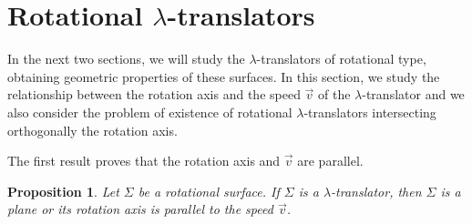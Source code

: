 \documentclass[12pt]{amsart}
\newtheorem{proposition}[theorem]{Proposition}
\theoremstyle{definition}
\begin{document}
\section{Rotational  $\lambda$-translators} \label{s3}
 
In the next two sections, we will study the $\lambda$-translators of rotational type, obtaining geometric properties of these surfaces. In this section, we   study the relationship between the rotation axis and the speed $\vec{v}$ of the  $\lambda$-translator and we also consider the problem of existence of rotational $\lambda$-translators intersecting orthogonally the rotation axis.

The first result proves that    the rotation axis and $\vec{v}$ are parallel.

\begin{proposition} \label{pr-ax}
Let $\Sigma$ be a   rotational surface. If $\Sigma$ is a $\lambda$-translator, then $\Sigma$ is a plane or its rotation axis is parallel to the speed $\vec{v}$.
\end{proposition}
\end{document}
